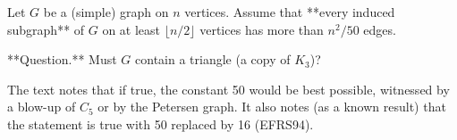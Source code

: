 Let $G$ be a (simple) graph on $n$ vertices.
Assume that **every induced subgraph** of $G$ on at least $\lfloor n/2\rfloor$ vertices has more than $n^2/50$ edges.

**Question.** Must $G$ contain a triangle (a copy of $K_3$)?

The text notes that if true, the constant 50 would be best possible, witnessed by a blow-up of $C_5$ or by the Petersen graph.
It also notes (as a known result) that the statement is true with 50 replaced by 16 (EFRS94).
